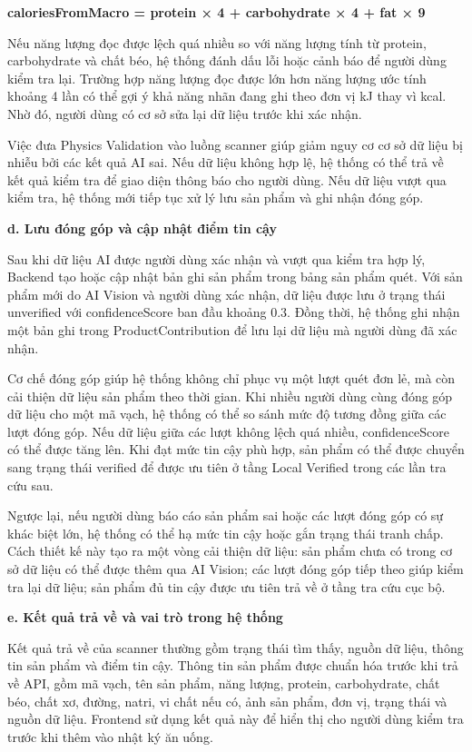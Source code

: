 \documentclass[12pt, a4paper]{report}
\begin{document}
\textbf{caloriesFromMacro = protein × 4 + carbohydrate × 4 + fat × 9}

Nếu năng lượng đọc được lệch quá nhiều so với năng lượng tính từ protein, carbohydrate và chất béo, hệ thống đánh dấu lỗi hoặc cảnh báo để người dùng kiểm tra lại. Trường hợp năng lượng đọc được lớn hơn năng lượng ước tính khoảng 4 lần có thể gợi ý khả năng nhãn đang ghi theo đơn vị kJ thay vì kcal. Nhờ đó, người dùng có cơ sở sửa lại dữ liệu trước khi xác nhận.

Việc đưa Physics Validation vào luồng scanner giúp giảm nguy cơ cơ sở dữ liệu bị nhiễu bởi các kết quả AI sai. Nếu dữ liệu không hợp lệ, hệ thống có thể trả về kết quả kiểm tra để giao diện thông báo cho người dùng. Nếu dữ liệu vượt qua kiểm tra, hệ thống mới tiếp tục xử lý lưu sản phẩm và ghi nhận đóng góp.

\textbf{d. Lưu đóng góp và cập nhật điểm tin cậy}

Sau khi dữ liệu AI được người dùng xác nhận và vượt qua kiểm tra hợp lý, Backend tạo hoặc cập nhật bản ghi sản phẩm trong bảng sản phẩm quét. Với sản phẩm mới do AI Vision và người dùng xác nhận, dữ liệu được lưu ở trạng thái unverified với confidenceScore ban đầu khoảng 0.3. Đồng thời, hệ thống ghi nhận một bản ghi trong ProductContribution để lưu lại dữ liệu mà người dùng đã xác nhận.

Cơ chế đóng góp giúp hệ thống không chỉ phục vụ một lượt quét đơn lẻ, mà còn cải thiện dữ liệu sản phẩm theo thời gian. Khi nhiều người dùng cùng đóng góp dữ liệu cho một mã vạch, hệ thống có thể so sánh mức độ tương đồng giữa các lượt đóng góp. Nếu dữ liệu giữa các lượt không lệch quá nhiều, confidenceScore có thể được tăng lên. Khi đạt mức tin cậy phù hợp, sản phẩm có thể được chuyển sang trạng thái verified để được ưu tiên ở tầng Local Verified trong các lần tra cứu sau.

Ngược lại, nếu người dùng báo cáo sản phẩm sai hoặc các lượt đóng góp có sự khác biệt lớn, hệ thống có thể hạ mức tin cậy hoặc gắn trạng thái tranh chấp. Cách thiết kế này tạo ra một vòng cải thiện dữ liệu: sản phẩm chưa có trong cơ sở dữ liệu có thể được thêm qua AI Vision; các lượt đóng góp tiếp theo giúp kiểm tra lại dữ liệu; sản phẩm đủ tin cậy được ưu tiên trả về ở tầng tra cứu cục bộ.

\textbf{e. Kết quả trả về và vai trò trong hệ thống}

Kết quả trả về của scanner thường gồm trạng thái tìm thấy, nguồn dữ liệu, thông tin sản phẩm và điểm tin cậy. Thông tin sản phẩm được chuẩn hóa trước khi trả về API, gồm mã vạch, tên sản phẩm, năng lượng, protein, carbohydrate, chất béo, chất xơ, đường, natri, vi chất nếu có, ảnh sản phẩm, đơn vị, trạng thái và nguồn dữ liệu. Frontend sử dụng kết quả này để hiển thị cho người dùng kiểm tra trước khi thêm vào nhật ký ăn uống.
\end{document}
